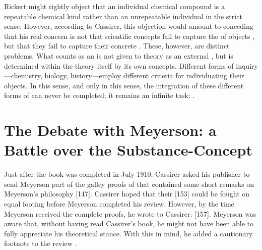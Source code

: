 \documentclass[submitted,12pt]{article}
\begin{document}
Rickert might rightly object that an individual chemical compound is a repeatable chemical kind rather than an unrepeatable individual in the strict sense. However, according to Cassirer, this objection would amount to conceding that his real concern is not that scientific concepts fail to capture the  of objects , but that they fail to capture their concrete   . These, however, are distinct problems. What counts as an  is not given to theory as an external , but is determined within the theory itself by its own  concepts. Different forms of inquiry---chemistry, biology, history---employ different criteria for individuating their objects. In this sense, and only in this sense, the integration of these different forms of  can never be completed; it remains an infinite task:  .

 
\section{The Debate with Meyerson: a Battle over the Substance-Concept}
\label{sec:meyerson}
%
Just after the book was completed in July 1910, Cassirer asked his publisher to send Meyerson part of the galley proofs of \SFt that contained some short remarks on Meyerson's philosophy  [147]. Cassirer hoped that their  [153] could be fought on equal footing before Meyerson completed his review. However, by the time Meyerson received the complete proofs, he wrote to Cassirer:  [157]. Meyerson was aware that, without having read Cassirer’s book, he might not have been able to fully appreciate his theoretical stance. With this in mind, he added a cautionary footnote to the review \citep[123]{Meyerson1911}.
\end{document}
